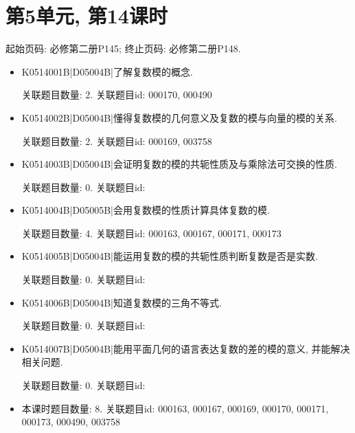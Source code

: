 \section*{第5单元, 第14课时}
起始页码: 必修第二册P145; 终止页码: 必修第二册P148.
\begin{itemize}
\item K0514001B|D05004B|了解复数模的概念.

关联题目数量: 2. 关联题目id: 000170, 000490

\item K0514002B|D05004B|懂得复数模的几何意义及复数的模与向量的模的关系.

关联题目数量: 2. 关联题目id: 000169, 003758

\item K0514003B|D05004B|会证明复数的模的共轭性质及与乘除法可交换的性质.

关联题目数量: 0. 关联题目id: 

\item K0514004B|D05005B|会用复数模的性质计算具体复数的模.

关联题目数量: 4. 关联题目id: 000163, 000167, 000171, 000173

\item K0514005B|D05004B|能运用复数的模的共轭性质判断复数是否是实数.

关联题目数量: 0. 关联题目id: 

\item K0514006B|D05004B|知道复数模的三角不等式.

关联题目数量: 0. 关联题目id: 

\item K0514007B|D05004B|能用平面几何的语言表达复数的差的模的意义, 并能解决相关问题.

关联题目数量: 0. 关联题目id: 

\item 本课时题目数量: 8. 关联题目id: 000163, 000167, 000169, 000170, 000171, 000173, 000490, 003758

\end{itemize}

